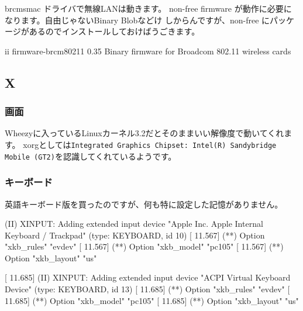 \documentclass[mingoth,a4paper]{jsarticle}
\begin{document}
brcmsmac ドライバで無線LANは動きます。
non-free firmware が動作に必要になります。自由じゃないBinary Blobなどけ
しからんですが、non-free にパッケージがあるのでインストールしておけばうごきます。

 \begin{commandline}
ii  firmware-brcm80211          0.35                        Binary firmware for Broadcom 802.11 wireless cards
 \end{commandline}

\subsection{X}

\subsubsection{画面}

Wheezyに入っているLinuxカーネル3.2だとそのままいい解像度で動いてくれます。
xorgとしては\texttt{Integrated Graphics Chipset: Intel(R) Sandybridge
Mobile (GT2)}を認識してくれているようです。


\subsubsection{キーボード}

英語キーボード版を買ったのですが、何も特に設定した記憶がありません。

\begin{commandline}
[    11.567] (II) XINPUT: Adding extended input device "Apple Inc. Apple Internal Keyboard / Trackpad" (type: KEYBOARD, id 10)
[    11.567] (**) Option "xkb_rules" "evdev"
[    11.567] (**) Option "xkb_model" "pc105"
[    11.567] (**) Option "xkb_layout" "us"

[    11.685] (II) XINPUT: Adding extended input device "ACPI Virtual Keyboard Device" (type: KEYBOARD, id 13)
[    11.685] (**) Option "xkb_rules" "evdev"
[    11.685] (**) Option "xkb_model" "pc105"
[    11.685] (**) Option "xkb_layout" "us"
\end{commandline}
\end{document}
